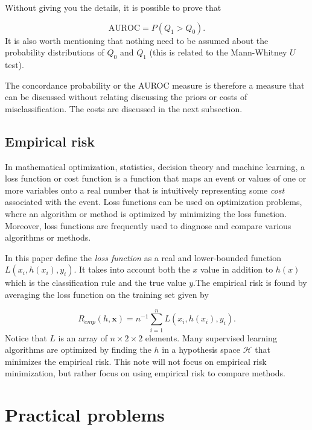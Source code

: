 \documentclass{article}
\theoremstyle{theorem}
\theoremstyle{definition}
\newcommand{\bv}[1]{\bm{#1}}
\begin{document}
Without giving you the details, it is possible to prove that 

\begin{equation}
\label{eq:concurrent}
\mbox{AUROC} = P(Q_1 > Q_0).
\end{equation}
It is also worth mentioning that nothing need to be assumed about the probability distributions of $Q_0$ and $Q_1$ (this is related to the Mann-Whitney $U$ test). 

The concordance probability or the AUROC measure is therefore a measure that can be discussed without relating discussing the priors or costs of misclassification.  The costs are discussed in the next subsection.

\subsection{Empirical risk}
\label{sec:empRisk}

In mathematical optimization, statistics, decision theory and machine learning, a loss function or cost function is a function that maps an event or values of one or more variables onto a real number that is intuitively representing some \emph{cost} associated with the event. Loss functions can be used on optimization problems, where an algorithm or method is optimized by minimizing the loss function.  Moreover, loss functions are frequently used to diagnose and compare various algorithms or methods.  

In this paper define the \emph{loss function} as a real and lower-bounded function $L(x_i, h(x_i), y_i)$. It takes into account both the $x$ value in addition to $h(x)$ which is the classification rule and the true value $y$.The empirical risk is found by averaging the loss function on the training set given by 

\begin{equation}
\label{def:empRisk}
R_{emp}(h, \bv{x}) = n^{-1} \sum_{i=1}^n L(x_i, h(x_i), y_i).
\end{equation}
Notice that $L$ is an array of $n \times 2\times 2$ elements.  Many supervised learning algorithms are optimized by finding the $h$ in a hypothesis space $\mathcal{H}$ that minimizes the empirical risk.  This note will not focus on empirical risk minimization, but rather focus on using empirical risk to compare methods.

\section{Practical problems}
\label{sec:practicalEmpRisk}
\end{document}
